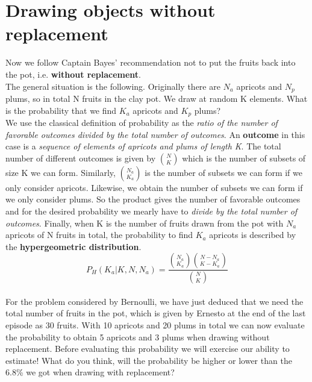 \documentclass[12pt, a4paper]{scrartcl}
\begin{document}
\section*{Drawing objects without replacement}
Now we follow Captain Bayes' recommendation not to put the fruits back into the pot, i.e. \textbf{without replacement}.\\
The general situation is the following. Originally there are $N_a$ apricots and $N_p$ plums, so in total N fruits in the clay pot. We draw at random K elements.
What is the probability that we find $K_a$ apricots and $K_p$ plums?\\
We use the classical definition of probability as the \textit{ratio of the number of favorable outcomes divided by the total number of outcomes}. 
An \textbf{outcome} in this case is a \textit{sequence of elements of apricots and plums of length K}.
The total number of different outcomes is given by ${N \choose K}$ which is the number of subsets of size K we can form. 
Similarly, ${N_a \choose K_a}$ is the number of subsets we can form if we only consider apricots.
Likewise, we obtain the number of subsets we can form if we only consider plums.
So the product gives the number of favorable outcomes and for the desired probability we mearly have to \textit{divide by the total number of outcomes}.
Finally, when K is the number of fruits drawn from the pot with $N_a$ apricots of N fruits in total, the probability to find $K_a$ apricots is described by the \textbf{hypergeometric distribution}.\\%
\begin{equation*}\boxed{P_H(K_a|K,N,N_a)=\frac{{N_a\choose K_a}{N-N_a\choose K-K_a}}{{N\choose K}}
}\end{equation*}\\


For the problem considered by Bernoulli, we have just deduced that we need the total number of fruits in the pot, which is given by Ernesto at the end of the last episode as 30 fruits.
With 10 apricots and 20 plums in total we can now evaluate the probability to obtain 5 apricots and 3 plums when drawing without replacement.
Before evaluating this probability we will exercise our ability to estimate! What do you think, will the probability be higher or lower than the 6.8\% we got when drawing with replacement?\\

\\
\end{document}
